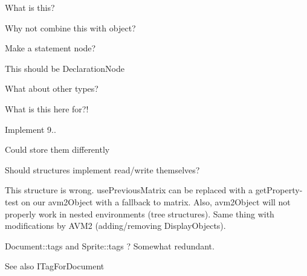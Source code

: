 
\begin{DoxyRefList}
\item[\label{todo__todo000004}%
\hypertarget{todo__todo000004}{}%
Class \hyperlink{classjswf_1_1avm2_1_1ast_1_1_activation_node}{jswf\+:\+:avm2\+:\+:ast\+:\+:Activation\+Node} ]What is this?  
\item[\label{todo__todo000002}%
\hypertarget{todo__todo000002}{}%
Class \hyperlink{classjswf_1_1avm2_1_1ast_1_1_attr_node}{jswf\+:\+:avm2\+:\+:ast\+:\+:Attr\+Node} ]Why not combine this with object?  
\item[\label{todo__todo000005}%
\hypertarget{todo__todo000005}{}%
Class \hyperlink{classjswf_1_1avm2_1_1ast_1_1_compound_node}{jswf\+:\+:avm2\+:\+:ast\+:\+:Compound\+Node} ]Make a statement node?  
\item[\label{todo__todo000006}%
\hypertarget{todo__todo000006}{}%
Class \hyperlink{classjswf_1_1avm2_1_1ast_1_1_definition_node}{jswf\+:\+:avm2\+:\+:ast\+:\+:Definition\+Node} ]This should be {\ttfamily Declaration\+Node}  
\item[\label{todo__todo000003}%
\hypertarget{todo__todo000003}{}%
Class \hyperlink{classjswf_1_1avm2_1_1ast_1_1_primitive_cast_node}{jswf\+:\+:avm2\+:\+:ast\+:\+:Primitive\+Cast\+Node} ]What about other types?  
\item[\label{todo__todo000001}%
\hypertarget{todo__todo000001}{}%
Class \hyperlink{classjswf_1_1avm2_1_1ast_1_1_void_node}{jswf\+:\+:avm2\+:\+:ast\+:\+:Void\+Node} ]What is this here for?!  
\item[\label{todo__todo000007}%
\hypertarget{todo__todo000007}{}%
Member \hyperlink{classjswf_1_1avm2_1_1_object_a69b39776062acaccd2cd2b5a1f937c9d}{jswf\+:\+:avm2\+:\+:Object\+:\+:coerce\+\_\+s} () const ]Implement 9..  
\item[\label{todo__todo000024}%
\hypertarget{todo__todo000024}{}%
Member \hyperlink{namespacejswf_a419cb8aa8b625074e6753d189783b2f4}{jswf\+:\+:fb\+\_\+t} ]Could store them differently  
\item[\label{todo__todo000011}%
\hypertarget{todo__todo000011}{}%
Class \hyperlink{structjswf_1_1flash_1_1_display_list_entry}{jswf\+:\+:flash\+:\+:Display\+List\+Entry} ]Should structures implement read/write themselves? 

This structure is wrong. {\ttfamily use\+Previous\+Matrix} can be replaced with a {\ttfamily get\+Property}-\/test on our {\ttfamily avm2\+Object} with a fallback to {\ttfamily matrix}. Also, {\ttfamily avm2\+Object} will not properly work in nested environments (tree structures). Same thing with modifications by A\+V\+M2 (adding/removing Display\+Objects).  
\item[\label{todo__todo000009}%
\hypertarget{todo__todo000009}{}%
Class \hyperlink{classjswf_1_1flash_1_1_document}{jswf\+:\+:flash\+:\+:Document} ]Document\+::tags and Sprite\+::tags ? Somewhat redundant. \begin{DoxySeeAlso}{See also}
I\+Tag\+For\+Document  
\end{DoxySeeAlso}


\end{DoxyRefList}
